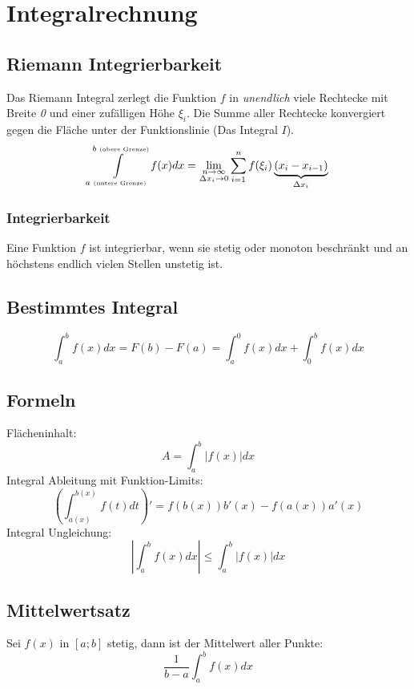 \section{Integralrechnung}

\subsection{Riemann Integrierbarkeit}
Das Riemann Integral zerlegt die Funktion $f$ in \textit{unendlich} viele Rechtecke mit Breite \textit{0} und einer zufälligen Höhe $\xi_i$. Die Summe aller Rechtecke konvergiert gegen die Fläche unter der Funktionslinie (Das Integral $I$).
\[
\int\limits_{a \text{ \tiny(untere Grenze)}}^{b \text{ \tiny(obere Grenze)}}f(x)dx = \lim_{\substack{n\to\infty\\\Delta x_i\to 0}} \sum\limits_{i = 1}^{n}f(\xi_i)\underbrace{(x_i - x_{i-1})}_{\Delta x_i}
\]

\subsubsection{Integrierbarkeit}
Eine Funktion $f$ ist integrierbar, wenn sie stetig oder monoton beschränkt und an höchstens endlich vielen Stellen unstetig ist.

\subsection{Bestimmtes Integral}
\[\int_{a}^{b}f(x)dx = F(b) - F(a) = \int_{a}^{0}f(x)dx + \int_{0}^{b}f(x)dx\]

\subsection{Formeln}
\noindent Flächeninhalt: \[A = \int_{a}^{b}\left|f(x)\right|dx\]
\noindent Integral Ableitung mit Funktion-Limits: \[\left(\int_{a(x)}^{b(x)}f(t)dt\right)' = f(b(x))b'(x) - f(a(x))a'(x)\]
\noindent Integral Ungleichung:
\[\left|\int_{a}^{b}f(x)dx\right| \leq \int_{a}^{b}\left|f(x)\right|dx\]

\subsection{Mittelwertsatz}
Sei $f(x)$ in $[a;b]$ stetig, dann ist der Mittelwert aller Punkte:
\[\frac{1}{b-a}\int_{a}^{b}f(x)dx\]

